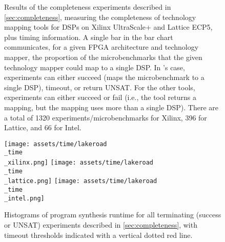 \begin{figure}
    \caption{
Results of 
  the completeness experiments
  described in \cref{sec:completeness},
  measuring the completeness 
  of technology mapping tools for DSPs on Xilinx UltraScale+ and Lattice ECP5,
  plus timing information.
A single bar in the bar chart
  communicates,
  for a given FPGA architecture
  and technology mapper,
  the proportion of the microbenchmarks
  that the given technology mapper could map to a single DSP.
In \lr's case, experiments can 
  either succeed 
  (\lr maps the microbenchmark
    to a single DSP),
  timeout,
  or return UNSAT.
For the other tools,
  experiments can either
  succeed
  or fail
  (i.e., the tool returns a mapping,
    but the mapping uses more than
    a single DSP).
There are a total of 
  1320 experiments/microbenchmarks for Xilinx,
  396 for Lattice,
  and 66 for Intel.
    }
    \label{fig:xilinx-completeness}
\end{figure}
\begin{figure}
    \centering
    \texttt{[image: assets/time/lakeroad\\\_time\\\_xilinx.png]}
    \texttt{[image: assets/time/lakeroad\\\_time\\\_lattice.png]}
    \texttt{[image: assets/time/lakeroad\\\_time\\\_intel.png]}
\caption{
Histograms of \lr program synthesis runtime
  for all terminating
  (success or UNSAT) \lr experiments
  described in \cref{sec:completeness}, with timeout thresholds indicated with a vertical
  dotted red line.
}
    \label{fig:lakeroad-synth-time}
\end{figure}


